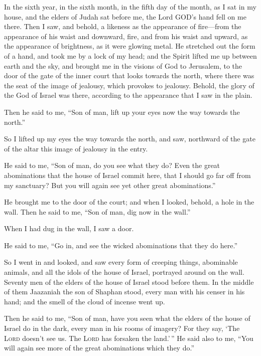  In the sixth year, in the sixth month, in the fifth day
of the month, as I sat in my house, and the elders of Judah sat before
me, the Lord GOD's hand fell on me there.  Then I saw, and
behold, a likeness as the appearance of fire---from the appearance of
his waist and downward, fire, and from his waist and upward, as the
appearance of brightness, as it were glowing metal.  He
stretched out the form of a hand, and took me by a lock of my head; and
the Spirit lifted me up between earth and the sky, and brought me in the
visions of God to Jerusalem, to the door of the gate of the inner court
that looks towards the north, where there was the seat of the image of
jealousy, which provokes to jealousy.  Behold, the glory
of the God of Israel was there, according to the appearance that I saw
in the plain.

 Then he said to me, ``Son of man, lift up your eyes now
the way towards the north.''

So I lifted up my eyes the way towards the north, and saw, northward of
the gate of the altar this image of jealousy in the entry.

 He said to me, ``Son of man, do you see what they do?
Even the great abominations that the house of Israel commit here, that I
should go far off from my sanctuary? But you will again see yet other
great abominations.''

 He brought me to the door of the court; and when I
looked, behold, a hole in the wall.  Then he said to me,
``Son of man, dig now in the wall.''

When I had dug in the wall, I saw a door.

 He said to me, ``Go in, and see the wicked abominations
that they do here.''

 So I went in and looked, and saw every form of creeping
things, abominable animals, and all the idols of the house of Israel,
portrayed around on the wall.  Seventy men of the elders
of the house of Israel stood before them. In the middle of them
Jaazaniah the son of Shaphan stood, every man with his censer in his
hand; and the smell of the cloud of incense went up.

 Then he said to me, ``Son of man, have you seen what the
elders of the house of Israel do in the dark, every man in his rooms of
imagery? For they say, `The \textsc{Lord} doesn't see us. The
\textsc{Lord} has forsaken the land.'\,''  He said also
to me, ``You will again see more of the great abominations which they
do.''


